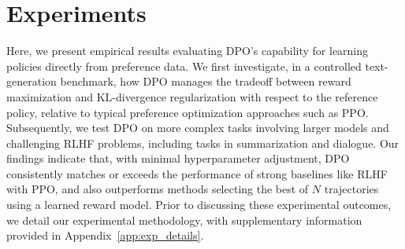 \section{Experiments}
Here, we present empirical results evaluating DPO’s capability for learning policies directly from preference data. We first investigate, in a controlled text-generation benchmark, how DPO manages the tradeoff between reward maximization and KL-divergence regularization with respect to the reference policy, relative to typical preference optimization approaches such as PPO. Subsequently, we test DPO on more complex tasks involving larger models and challenging RLHF problems, including tasks in summarization and dialogue. Our findings indicate that, with minimal hyperparameter adjustment, DPO consistently matches or exceeds the performance of strong baselines like RLHF with PPO, and also outperforms methods selecting the best of $N$ trajectories using a learned reward model. Prior to discussing these experimental outcomes, we detail our experimental methodology, with supplementary information provided in Appendix~\ref{app:exp_details}.

